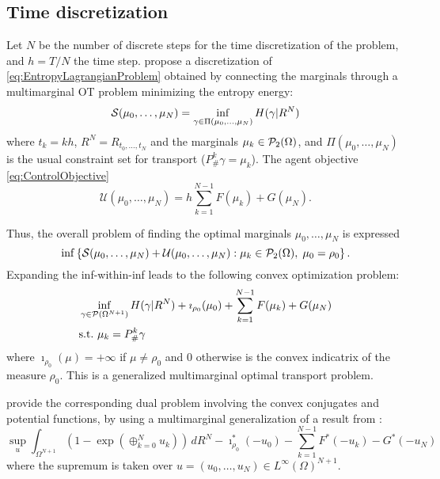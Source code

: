 \documentclass[../report.tex]{subfiles}
\begin{document}
\subsection{Time discretization}

Let $N$ be the number of discrete steps for the time discretization of the problem, and $h=T/N$ the time step.
\textcite{benamou2018entropy} propose a discretization of \eqref{eq:EntropyLagrangianProblem} obtained by connecting the marginals through a multimarginal OT problem minimizing the entropy energy:
\begin{equation}
\mathcal{S}(\mu_0,\ldots,\mu_N) =
\inf_{\gamma \in \Pi(\mu_0, \ldots, \mu_N)}
H(\gamma|R^N)
\end{equation}
where $t_k = kh$, $R^N = R_{t_0,\ldots,t_N}$ and the marginals $\mu_k \in \mathcal{P}_2(\Omega)$, and $\Pi(\mu_0, \ldots, \mu_N)$ is the usual constraint set for transport ($P^k_{\#}\gamma = \mu_k$). The agent objective \cref{eq:ControlObjective}
\begin{equation}
\mathcal{U}(\mu_0,\ldots,\mu_N) = h\sum_{k=1}^{N-1} F(\mu_k) + G(\mu_N).
\end{equation}

Thus, the overall problem of finding the optimal marginals $\mu_0,\ldots,\mu_N$ is expressed
\begin{equation}
	\inf\left\{
	\mathcal{S}(\mu_0, \ldots, \mu_N) + \mathcal{U}(\mu_0, \ldots, \mu_N) 
	: \mu_k \in \mathcal{P}_2(\Omega),\; \mu_0 = \rho_0
	\right\}.
\end{equation}
Expanding the inf-within-inf leads to the following convex optimization problem:
\begin{equation}
\begin{aligned}
&\inf_{\gamma \in \mathcal{P}(\Omega^{N+1})}
H(\gamma | R^N) + \imath_{\rho_0}(\mu_0) + \sum_{k=1}^{N-1} F(\mu_k) + G(\mu_N) \\
&\mathrm{s.t.}\ \mu_k = P^k_\#\gamma
\end{aligned}
\end{equation}
where $\imath_{\rho_0}(\mu) = +\infty$ if $\mu\neq \rho_0$ and $0$ otherwise is the convex indicatrix of the measure $\rho_0$. This is a generalized multimarginal optimal transport problem.

\textcite{benamou2018entropy} provide the corresponding dual problem involving the convex conjugates and potential functions, by using a multimarginal generalization of a result from \textcite{chizat2016scaling}:
\begin{equation}\label{eq:TimeDiscreteDual}
\sup_u
\int_{\Omega^{N+1}} \left(1-\exp\left(\oplus_{k=0}^N u_k\right)\right) \,dR^N
-\imath_{\rho_0}^*(-u_0) - \sum_{k=1}^{N-1} F^*(-u_k) - G^*(-u_N)
\end{equation}
where the supremum is taken over $u = (u_0,\ldots,u_N) \in L^\infty(\Omega)^{N+1}$.
\end{document}
